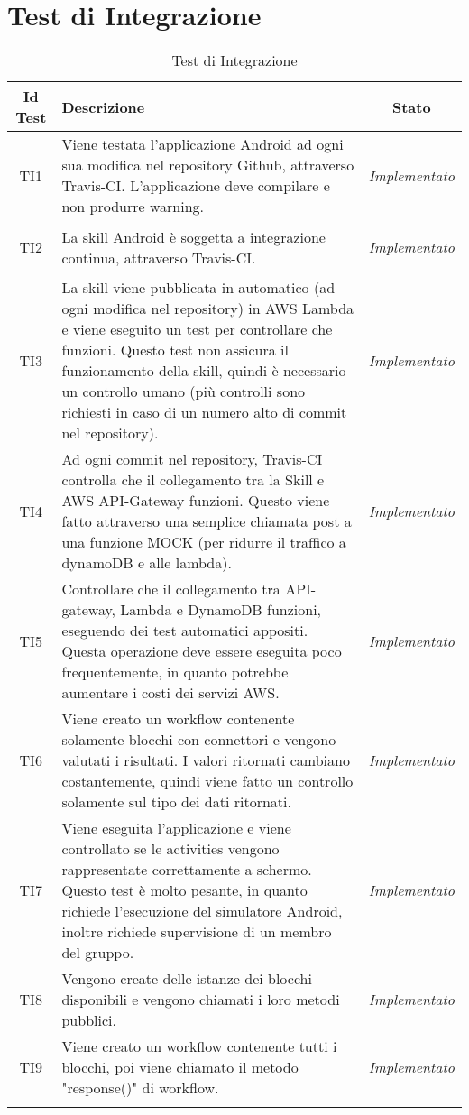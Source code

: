 \section{Test di Integrazione}
\normalsize
\begin{longtable}{|c|>{}m{8cm}|c|}
\hline 
\textbf{Id Test} & \textbf{Descrizione} & \textbf{Stato}\\
\hline
\endhead
\hypertarget{TI1}{TI1} & Viene testata l'applicazione Android ad ogni sua modifica nel repository Github, attraverso Travis-CI. L'applicazione deve compilare e non produrre warning. & \textit{Implementato}\\ \hline
\hypertarget{TI2}{TI2} & La skill Android è soggetta a integrazione continua, attraverso Travis-CI. & \textit{Implementato}\\ \hline
\hypertarget{TI3}{TI3} & La skill viene pubblicata in automatico (ad ogni modifica nel repository) in AWS Lambda e viene eseguito un test per controllare che funzioni. Questo test non assicura il funzionamento della skill, quindi è necessario un controllo umano (più controlli sono richiesti in caso di un numero alto di commit nel repository). & \textit{Implementato}\\ \hline
\hypertarget{TI4}{TI4} & Ad ogni commit nel repository, Travis-CI controlla che il collegamento tra la Skill e AWS API-Gateway funzioni. Questo viene fatto attraverso una semplice chiamata post a una funzione MOCK (per ridurre il traffico a dynamoDB e alle lambda). & \textit{Implementato}\\ \hline
\hypertarget{TI5}{TI5} & Controllare che il collegamento tra API-gateway, Lambda e DynamoDB funzioni, eseguendo dei test automatici appositi. Questa operazione deve essere eseguita poco frequentemente, in quanto potrebbe aumentare i costi dei servizi AWS. & \textit{Implementato}\\ \hline
\hypertarget{TI6}{TI6} & Viene creato un workflow contenente solamente blocchi con connettori e vengono valutati i risultati. I valori ritornati cambiano costantemente, quindi viene fatto un controllo solamente sul tipo dei dati ritornati. & \textit{Implementato}\\ \hline
\hypertarget{TI7}{TI7} & Viene eseguita l'applicazione e viene controllato se le activities vengono rappresentate correttamente a schermo. Questo test è molto pesante, in quanto richiede l'esecuzione del simulatore Android, inoltre richiede supervisione di un membro del gruppo. & \textit{Implementato}\\ \hline
\hypertarget{TI8}{TI8} & Vengono create delle istanze dei blocchi disponibili e vengono chiamati i loro metodi pubblici. & \textit{Implementato}\\ \hline
\hypertarget{TI9}{TI9} & Viene creato un workflow contenente tutti i blocchi, poi viene chiamato il metodo "response()" di workflow. & \textit{Implementato}\\ \hline
\caption[Test di Integrazione]{Test di Integrazione}
\label{tabella:test2}
\end{longtable}
\clearpage

